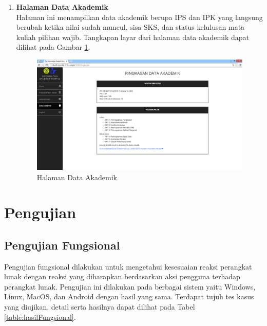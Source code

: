 \begin{enumerate}
				\item\textbf{Halaman Data Akademik}\\
				Halaman ini menampilkan data akademik berupa IPS dan IPK yang langsung berubah ketika nilai sudah muncul, sisa SKS, dan status kelulusan mata kuliah pilihan wajib. Tangkapan layar dari halaman data akademik dapat dilihat pada Gambar \ref{fig:5_hasil_ringkasan}.
				\begin{figure}[H]
						\centering
						\includegraphics[scale=0.34]{Gambar/hasil_ringkasan}
						\caption{Halaman Data Akademik} 
						\label{fig:5_hasil_ringkasan}
					\end{figure}
			\end{enumerate}
				
\section{Pengujian}
			\subsection{Pengujian Fungsional} 
			Pengujian fungsional dilakukan untuk mengetahui kesesuaian reaksi perangkat lunak dengan reaksi yang diharapkan berdasarkan aksi pengguna terhadap perangkat lunak. Pengujian ini dilakukan pada berbagai sistem yaitu Windows, Linux, MacOS, dan Android dengan hasil yang sama. Terdapat tujuh tes kasus yang diujikan, detail serta hasilnya dapat dilihat pada Tabel \ref{table:hasilFungsional}.
			
